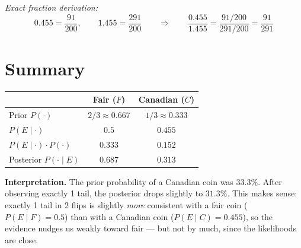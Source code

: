 \documentclass[12pt]{article}
\begin{document}
\textit{Exact fraction derivation:}
\[
0.455 = \frac{91}{200}, \qquad 1.455 = \frac{291}{200}
\qquad \Longrightarrow \qquad
\frac{0.455}{1.455} = \frac{91/200}{291/200} = \frac{91}{291}
\]

\section*{Summary}

\begin{center}
\begin{tabular}{lcc}
\toprule
 & Fair ($F$) & Canadian ($C$) \\
\midrule
Prior $P(\cdot)$ & $2/3 \approx 0.667$ & $1/3 \approx 0.333$ \\
$P(E \mid \cdot)$ & $0.5$ & $0.455$ \\
$P(E \mid \cdot)\cdot P(\cdot)$ & $0.333$ & $0.152$ \\
\midrule
Posterior $P(\cdot \mid E)$ & $0.687$ & $\mathbf{0.313}$ \\
\bottomrule
\end{tabular}
\end{center}

\medskip
\textbf{Interpretation.} The prior probability of a Canadian coin was $33.3\%$.
After observing exactly 1 tail, the posterior drops slightly to $31.3\%$.
This makes sense: exactly 1 tail in 2 flips is slightly \emph{more} consistent
with a fair coin ($P(E \mid F) = 0.5$) than with a Canadian coin
($P(E \mid C) = 0.455$), so the evidence nudges us weakly toward fair --- but
not by much, since the likelihoods are close.
\end{document}
